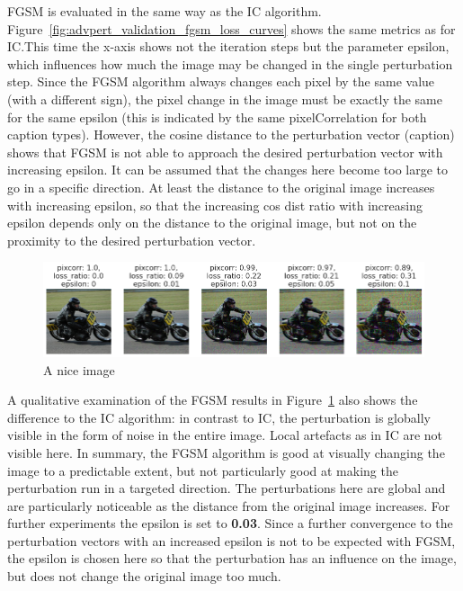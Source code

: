 FGSM is evaluated in the same way as the IC algorithm. Figure~\ref{fig:advpert_validation_fgsm_loss_curves} shows the same metrics as for IC.\@ This time the x-axis shows not the iteration steps but the parameter epsilon, which influences how much the image may be changed in the single perturbation step. Since the FGSM algorithm always changes each pixel by the same value (with a different sign), the pixel change in the image must be exactly the same for the same epsilon (this is indicated by the same pixelCorrelation for both caption types). However, the cosine distance to the perturbation vector (caption) shows that FGSM is not able to approach the desired perturbation vector with increasing epsilon. It can be assumed that the changes here become too large to go in a specific direction. At least the distance to the original image increases with increasing epsilon, so that the increasing cos dist ratio with increasing epsilon depends only on the distance to the original image, but not on the proximity to the desired perturbation vector. 

    \begin{figure}[ht]
        \centering
        \includegraphics[width=1\textwidth]{plots/advpert_fgsm_qual_validation_evolution.png}
        \caption{A nice image}\label{fig:advpert_fgsm_qual_validation_evolution}
    \end{figure}
    

A qualitative examination of the FGSM results in Figure~\ref{fig:advpert_fgsm_qual_validation_evolution} also shows the difference to the IC algorithm: in contrast to IC, the perturbation is globally visible in the form of noise in the entire image. Local artefacts as in IC are not visible here. In summary, the FGSM algorithm is good at visually changing the image to a predictable extent, but not particularly good at making the perturbation run in a targeted direction. The perturbations here are global and are particularly noticeable as the distance from the original image increases. For further experiments the epsilon is set to \textbf{0.03}. Since a further convergence to the perturbation vectors with an increased epsilon is not to be expected with FGSM, the epsilon is chosen here so that the perturbation has an influence on the image, but does not change the original image too much.

